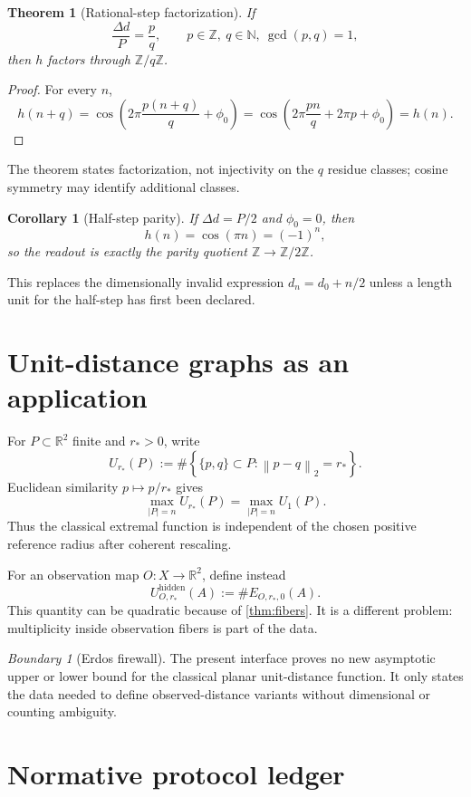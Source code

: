 \documentclass[11pt,a4paper]{article}
\theoremstyle{definition}
\theoremstyle{plain}
\newtheorem{theorem}[definition]{Theorem}
\newtheorem{corollary}[definition]{Corollary}
\theoremstyle{remark}
\newtheorem{warning}[definition]{Boundary}
\newcommand{\R}{\mathbb{R}}
\newcommand{\Z}{\mathbb{Z}}
\newcommand{\abs}[1]{\left\lvert #1\right\rvert}
\newcommand{\norm}[1]{\left\lVert #1\right\rVert}
\newcommand{\set}[1]{\left\{#1\right\}}
\begin{document}
\begin{theorem}[Rational-step factorization]
\label{thm:alias}
If
\[
 \frac{\Delta d}{P}=\frac pq,\qquad
 p\in\Z,\ q\in\mathbb N,\ \gcd(p,q)=1,
\]
then $h$ factors through $\Z/q\Z$.
\end{theorem}

\begin{proof}
For every $n$,
\[
h(n+q)
=
\cos\left(2\pi\frac{p(n+q)}q+\phi_0\right)
=
\cos\left(2\pi\frac{pn}q+2\pi p+\phi_0\right)
=h(n).
\]
\end{proof}

The theorem states factorization, not injectivity on the $q$ residue
classes; cosine symmetry may identify additional classes.

\begin{corollary}[Half-step parity]
If $\Delta d=P/2$ and $\phi_0=0$, then
\[
 h(n)=\cos(\pi n)=(-1)^n,
\]
so the readout is exactly the parity quotient $\Z\to\Z/2\Z$.
\end{corollary}

This replaces the dimensionally invalid expression
$d_n=d_0+n/2$ unless a length unit for the half-step has first been
declared.

\section{Unit-distance graphs as an application}

For $P\subset\R^2$ finite and $r_*>0$, write
\[
 U_{r_*}(P)
 :=
 \#\set{\{p,q\}\subset P:\norm{p-q}_2=r_*}.
\]
Euclidean similarity $p\mapsto p/r_*$ gives
\[
 \max_{\abs P=n}U_{r_*}(P)
 =
 \max_{\abs P=n}U_1(P).
\]
Thus the classical extremal function is independent of the chosen
positive reference radius after coherent rescaling.

For an observation map $O:X\to\R^2$, define instead
\[
 U_{O,r_*}^{\mathrm{hidden}}(A)
 :=
 \#E_{O,r_*,0}(A).
\]
This quantity can be quadratic because of \cref{thm:fibers}. It is a
different problem: multiplicity inside observation fibers is part of the
data.

\begin{warning}[Erdos firewall]
The present interface proves no new asymptotic upper or lower bound for
the classical planar unit-distance function. It only states the data
needed to define observed-distance variants without dimensional or
counting ambiguity.
\end{warning}

\section{Normative protocol ledger}
\end{document}
